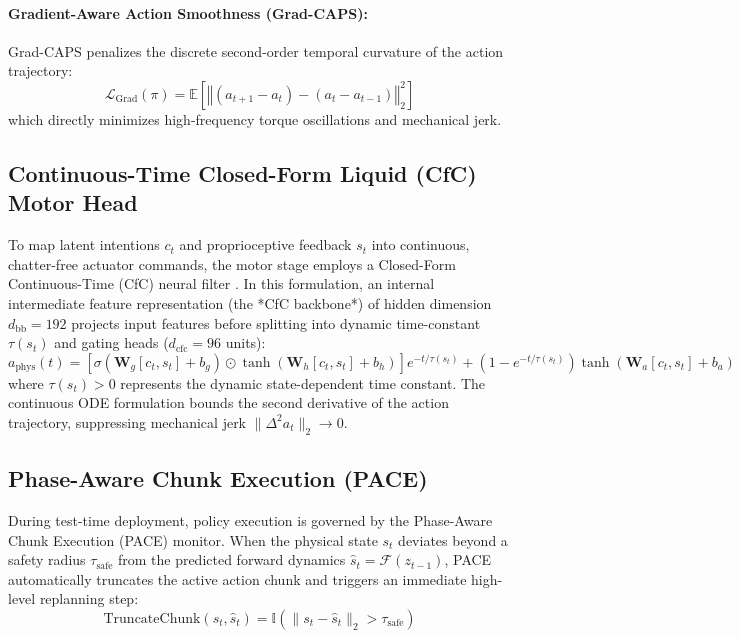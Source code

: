 \documentclass{article}
\begin{document}
\paragraph{Gradient-Aware Action Smoothness (Grad-CAPS):} 
Grad-CAPS penalizes the discrete second-order temporal curvature of the action trajectory:
\begin{equation}
    \mathcal{L}_{\text{Grad}}(\pi) = \mathbb{E} \left[ \left\Vert (a_{t+1} - a_t) - (a_t - a_{t-1}) \right\Vert_2^2 \right]
\end{equation}
which directly minimizes high-frequency torque oscillations and mechanical jerk.

\subsection{Continuous-Time Closed-Form Liquid (CfC) Motor Head}
To map latent intentions $c_t$ and proprioceptive feedback $s_t$ into continuous, chatter-free actuator commands, the motor stage employs a Closed-Form Continuous-Time (CfC) neural filter \cite{hasani2022closed}. In this formulation, an internal intermediate feature representation (the *CfC backbone*) of hidden dimension $d_{\text{bb}} = 192$ projects input features before splitting into dynamic time-constant $\tau(s_t)$ and gating heads ($d_{\text{cfc}} = 96$ units):
\begin{equation}
    a_{\text{phys}}(t) = \left[ \sigma(\mathbf{W}_g [c_t, s_t] + b_g) \odot \tanh(\mathbf{W}_h [c_t, s_t] + b_h) \right] e^{-t/\tau(s_t)} + (1 - e^{-t/\tau(s_t)}) \tanh(\mathbf{W}_a [c_t, s_t] + b_a)
\end{equation}
where $\tau(s_t) > 0$ represents the dynamic state-dependent time constant. The continuous ODE formulation bounds the second derivative of the action trajectory, suppressing mechanical jerk $\|\Delta^2 a_t\|_2 \to 0$.

\subsection{Phase-Aware Chunk Execution (PACE)}
During test-time deployment, policy execution is governed by the Phase-Aware Chunk Execution (PACE) monitor. When the physical state $s_t$ deviates beyond a safety radius $\tau_{\text{safe}}$ from the predicted forward dynamics $\hat{s}_{t} = \mathcal{F}(z_{t-1})$, PACE automatically truncates the active action chunk and triggers an immediate high-level replanning step:
\begin{equation}
    \text{TruncateChunk}(s_t, \hat{s}_t) = \mathbb{I}\left( \|s_t - \hat{s}_t\|_2 > \tau_{\text{safe}} \right)
\end{equation}
\end{document}
